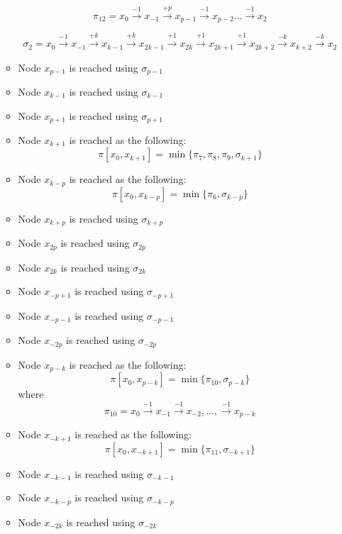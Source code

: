 \begin{itemize}
\begin{itemize}
$$\pi_{12}= x_{0} \xrightarrow {-1} x_{-1} \xrightarrow {+p} x_{p-1} \xrightarrow {-1}  x_{p-2} ... \xrightarrow {-1}  x_{2}$$ 

$$\sigma_{2}=x_{0} \xrightarrow {-1} x_{-1} \xrightarrow {+k} x_{k-1} \xrightarrow {+k} x_{2k-1} \xrightarrow {+1} x_{2k}  \xrightarrow {+1} x_{2k+1} \xrightarrow {+1} x_{2k+2} \xrightarrow {-k} x_{k+2} \xrightarrow {-k} x_{2}$$

\item Node $x_{p-1}$ is reached using $\sigma_{p-1}$ 

\item Node $x_{k-1}$ is reached using $\sigma_{k-1}$ 

\item Node $x_{p+1}$ is reached using $\sigma_{p+1}$ 


\item Node $x_{k+1}$ is reached as the following:  
$$ \pi[x_0,x_{k+1}] = \min \{ \pi_7,\pi_8,\pi_9,\sigma_{k+1}\}$$

\item Node $x_{k-p}$ is reached as the following:  
$$ \pi[x_0,x_{k-p}] = \min \{ \pi_6,\sigma_{k-p}\}$$

\item Node $x_{k+p}$ is reached using $\sigma_{k+p}$ 

\item Node $x_{2p}$ is reached using $\sigma_{2p}$ 

\item Node $x_{2k}$ is reached using $\sigma_{2k}$ 

\item Node $x_{-p+1}$ is reached using $\sigma_{-p+1}$ 

\item Node $x_{-p-1}$ is reached using $\sigma_{-p-1}$ 

\item Node $x_{-2p}$ is reached using $\sigma_{-2p}$ 

\item Node $x_{p-k}$ is reached as the following:  
$$ \pi[x_0,x_{p-k}] = \min \{ \pi_{10},\sigma_{p-k}\}$$
where
$$\pi_{10}= x_{0}\xrightarrow {-1} x_{-1}\xrightarrow {-1} x_{-2} ,...,\xrightarrow {-1} x_{p-k}$$

\item Node $x_{-k+1}$ is reached as the following:
$$ \pi[x_0,x_{-k+1}] = \min \{ \pi_{11},\sigma_{-k+1}\}$$

\item Node $x_{-k-1}$ is reached using $\sigma_{-k-1}$ 


\item Node $x_{-k-p}$ is reached using $\sigma_{-k-p}$ 

\item Node $x_{-2k}$ is reached using $\sigma_{-2k}$ 


\end{itemize}

\end{itemize}
